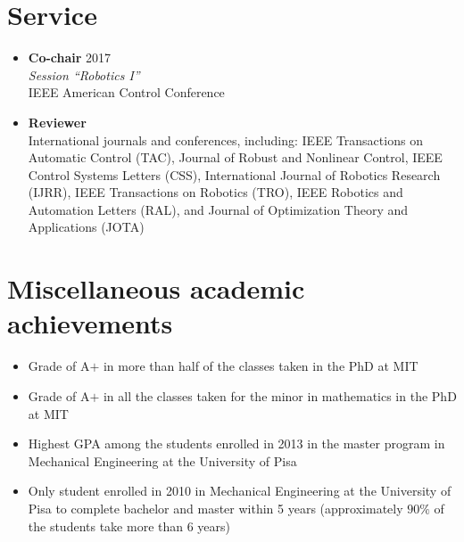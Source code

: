\documentclass[11pt,a4paper,sans]{moderncv}
\begin{document}
\section{Service}

\vspace{5pt}

\begin{itemize}

\item \textbf{Co-chair} \hfill 2017 \\
\textit{Session ``Robotics I''} \\
IEEE American Control Conference

\item \textbf{Reviewer} \\
International journals and conferences, including:
IEEE Transactions on Automatic Control (TAC),
Journal of Robust and Nonlinear Control,
IEEE Control Systems Letters (CSS),
International Journal of Robotics Research (IJRR),
IEEE Transactions on Robotics (TRO),
IEEE Robotics and Automation Letters (RAL), and
Journal of Optimization Theory and Applications (JOTA)

\end{itemize}

\section{Miscellaneous academic achievements}

\vspace{5pt}

\begin{itemize}

\item Grade of A$+$ in more than half of the classes taken in the PhD at MIT

\item Grade of A$+$ in all the classes taken for the minor in mathematics in the PhD at MIT

\item Highest GPA among the students enrolled in 2013 in the master program in Mechanical Engineering at the University of Pisa

\item Only student enrolled in 2010 in Mechanical Engineering at the University of Pisa to complete bachelor and master within 5 years (approximately $90\%$ of the students take more than 6 years)

\end{itemize}

\end{document}
